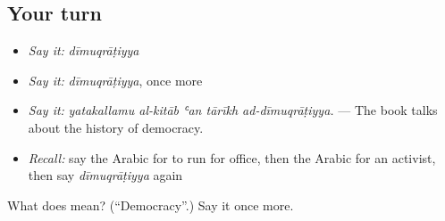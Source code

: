 \subsection*{Your turn}
\begin{itemize}
\raggedright
  \item \emph{Say it:} \emph{dīmuqrāṭiyya}
  \item \emph{Say it:} \emph{dīmuqrāṭiyya}, once more
  \item \emph{Say it:} \emph{yatakallamu al-kitāb ʿan tārīkh ad-dīmuqrāṭiyya.} — The book talks about the history of democracy.
  \item \emph{Recall:} say the Arabic for to run for office, then the Arabic for an activist, then say \emph{dīmuqrāṭiyya} again
\end{itemize}

\begin{tcolorbox}[breakable,colback=teal!4,colframe=teal!35!black,title={Before you move on}]
What does  mean? (\textquotedblleft{}Democracy\textquotedblright{}.) Say it once more.
\end{tcolorbox}
